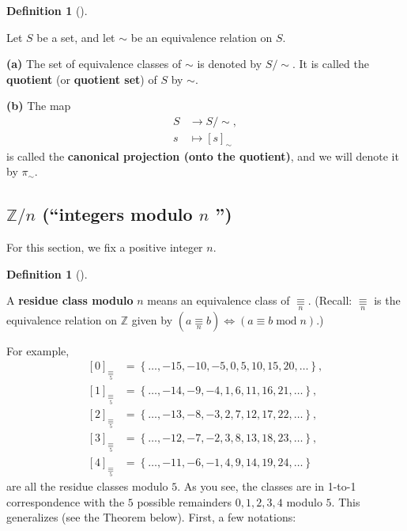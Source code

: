 \documentclass[numbers=enddot,12pt,final,onecolumn,notitlepage]{scrartcl}%
\numberwithin{exer}{subsection}
\theoremstyle{definition}
\newtheorem{defi}[theo]{Definition}
\newenvironment{definition}[1][]
{\begin{defi}[#1]\begin{leftbar}}
{\end{leftbar}\end{defi}}
\begin{document}
\begin{definition}
Let $S$ be a set, and let $\sim$ be an equivalence relation on $S$.

\textbf{(a)} The set of equivalence classes of $\sim$ is denoted by $S/\sim$.
It is called the \textbf{quotient} (or \textbf{quotient set}) of $S$ by $\sim$.

\textbf{(b)} The map%
\begin{align*}
S  & \rightarrow S/\sim,\\
s  & \mapsto\left[  s\right]  _{\sim}%
\end{align*}
is called the \textbf{canonical projection (onto the quotient)}, and we will
denote it by $\pi_{\sim}$.
\end{definition}

\subsection{$\mathbb{Z}/n$ (\textquotedblleft integers modulo $n$%
\textquotedblright)}

For this section, we fix a positive integer $n$.

\begin{definition}
A \textbf{residue class modulo }$n$ means an equivalence class of
$\underset{n}{\equiv}$. (Recall: $\underset{n}{\equiv}$ is the equivalence
relation on $\mathbb{Z}$ given by $\left(  a\underset{n}{\equiv}b\right)
\Longleftrightarrow\left(  a\equiv b\operatorname{mod}n\right)  $.)
\end{definition}

For example,%
\begin{align*}
\left[  0\right]  _{\underset{5}{\equiv}}  & =\left\{  \ldots
,-15,-10,-5,0,5,10,15,20,\ldots\right\}  ,\\
\left[  1\right]  _{\underset{5}{\equiv}}  & =\left\{  \ldots
,-14,-9,-4,1,6,11,16,21,\ldots\right\}  ,\\
\left[  2\right]  _{\underset{5}{\equiv}}  & =\left\{  \ldots
,-13,-8,-3,2,7,12,17,22,\ldots\right\}  ,\\
\left[  3\right]  _{\underset{5}{\equiv}}  & =\left\{  \ldots
,-12,-7,-2,3,8,13,18,23,\ldots\right\}  ,\\
\left[  4\right]  _{\underset{5}{\equiv}}  & =\left\{  \ldots
,-11,-6,-1,4,9,14,19,24,\ldots\right\}
\end{align*}
are all the residue classes modulo $5$. As you see, the classes are in 1-to-1
correspondence with the $5$ possible remainders $0,1,2,3,4$ modulo $5$. This
generalizes (see the Theorem below). First, a few notations:
\end{document}
